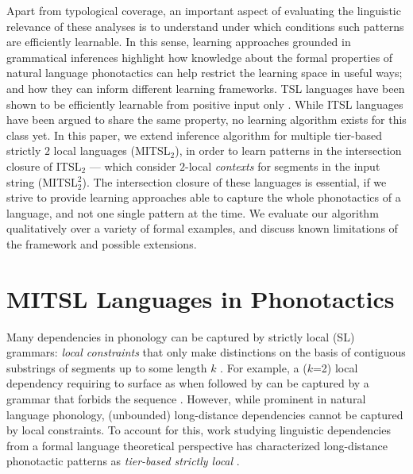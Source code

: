 \documentclass[11pt,a4paper]{article}
\begin{document}
Apart from typological coverage, an important aspect of evaluating the linguistic relevance of these analyses is to understand under which conditions such patterns are efficiently learnable.
In this sense, learning approaches grounded in grammatical inferences highlight how knowledge about the formal properties of natural language phonotactics can help restrict the learning space in useful ways; and how they can inform different learning frameworks.
TSL languages have been shown to be efficiently learnable from positive input only \cite{JardineHeinz16,jardinemcmullin17}.
While ITSL languages have been argued to share the same property, no learning algorithm exists for this class yet.
In this paper, we extend \citet{McMullinSCIL2019} inference algorithm for multiple tier-based strictly $2$ local languages (MITSL$_2$), in order to learn patterns in the intersection closure of ITSL$_2$ --- which consider $2$-local \emph{contexts} for segments in the input string (MITSL$^2_2$). 
The intersection closure of these languages is essential, if we strive to provide learning approaches able to capture the whole phonotactics of a language, and not one single pattern at the time.
We evaluate our algorithm qualitatively over a variety of formal examples, and discuss known limitations of the framework and possible extensions.

\section{MITSL Languages in Phonotactics}
\label{sec:MITSL}


Many dependencies in phonology can be captured by strictly local (SL) grammars: \emph{local constraints} that only make distinctions on the basis of contiguous substrings of segments up to some length $k$ \citep[essentially, $k$-grams;][]{Heinz2011a}.
For example, a ($k$=2) local dependency requiring  to surface as \textipa{[z]} when followed by \textipa{[l]} can be captured by a grammar that forbids the sequence \textipa{[sl]}.
However, while prominent in natural language phonology, (unbounded) long-distance dependencies cannot be captured by local constraints.
To account for this, work studying linguistic dependencies from a formal language theoretical perspective has characterized long-distance phonotactic patterns  as \emph{tier-based strictly local} \citep[TSL;][]{HeinzRawalTanner}.
\end{document}

